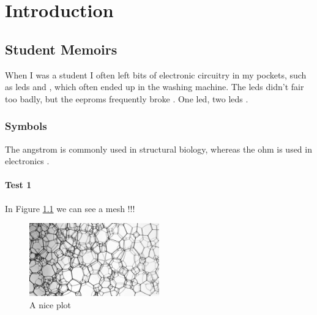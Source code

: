 
\chapter{Introduction} \label{chapter:intro}


	\section{Student Memoirs}

When I was a student I often left bits of electronic circuitry
in my pockets, such as \glspl{led} and , which
often ended up in the washing machine. The \glspl{led} didn't
fair too badly, but the \glspl{eeprom} frequently broke \cite{citRef2}. One \gls{led}, two \glspl{led} \cite{citRef1}.

\subsection{Symbols}

The \gls{angstrom} is commonly used in structural biology,
whereas the \gls{ohm} is used in electronics \cite{citRef2,citRef3}.
	
	\subsubsection{Test 1}
	
	In Figure \ref{fig:mesh1} we can see a mesh !!!
	
	\begin{figure}[h]
    		\centering
    		\includegraphics[width=0.5\textwidth]{../images/introduction/mesh}
    		\caption{A nice plot}
    		\label{fig:mesh1}
	\end{figure}
	
